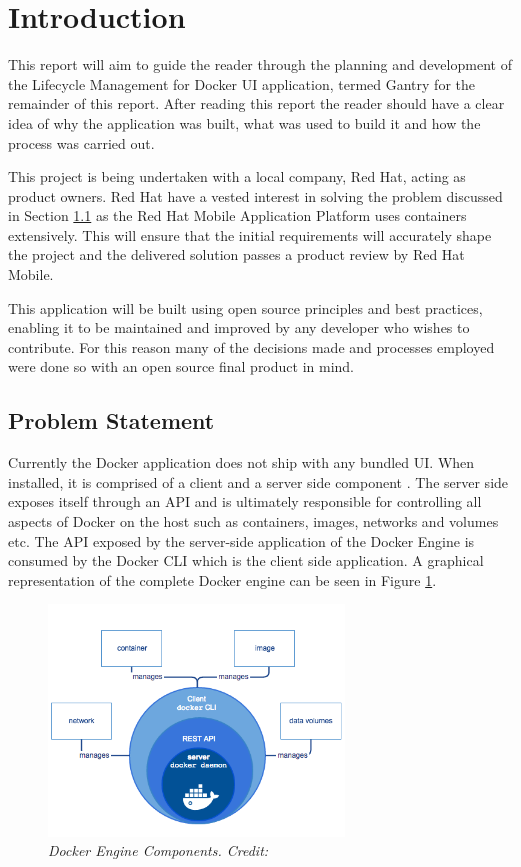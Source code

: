 \section{Introduction}
\label{sec:intro}
This report will aim to guide the reader through the planning and development of the Lifecycle Management for Docker \gls{UI} application, termed Gantry for the remainder of this report. After reading this report the reader should have a clear idea of why the application was built, what was used to build it and how the process was carried out.

This project is being undertaken with a local company, Red Hat, acting as product owners. Red Hat have a vested interest in solving the problem discussed in Section \ref{sub:problem} as the Red Hat Mobile Application Platform uses containers extensively. This will ensure that the initial requirements will accurately shape the project and the delivered solution passes a product review by Red Hat Mobile.

This application will be built using open source principles and best practices, enabling it to be maintained and improved by any developer who wishes to contribute. For this reason many of the decisions made and processes employed were done so with an open source final product in mind.

\subsection{Problem Statement}
\label{sub:problem}
Currently the \gls{Docker} application does not ship with any bundled \gls{UI}. When installed, it is comprised of a client and a server side component \citep{Docker2017}. The server side exposes itself through an \gls{API} and is ultimately responsible for controlling all aspects of Docker on the host such as containers, images, networks and volumes etc. The API exposed by the server-side application of the Docker Engine is consumed by the Docker \gls{CLI} which is the client side application. A graphical representation of the complete Docker engine can be seen in Figure \ref{fig:docker_engine}.

\begin{figure}[!ht]
\centering
\includegraphics*[width=0.7\textwidth]{images/docker_engine}
\caption{\em Docker Engine Components. Credit: \citep{Docker2017}}
\label{fig:docker_engine}
\end{figure}

